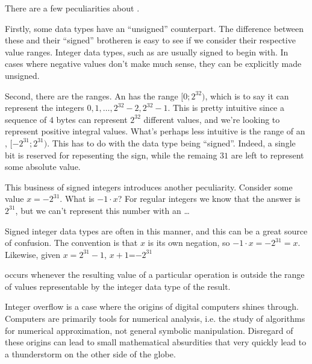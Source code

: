 There are a few peculiarities about .

Firstly, some data types have an ``unsigned'' counterpart. The difference
between these and their ``signed'' brotheren is easy to see if we consider
their respective value ranges. Integer data types, such as are usually signed
to begin with. In cases where negative values don't make much sense, they can
be explicitly made unsigned.

Second, there are the ranges. An  has the range
$[0;2^{32})$, which is to say it can represent the integers
$0,1,\ldots,2^{32}-2,2^{32}-1$. This is pretty intuitive since a sequence of
$4$ bytes can represent $2^{32}$ different values, and we're looking to
represent positive integral values. What's perhaps less intuitive is the range
of an , $[-2^{31};2^{31})$. This has to do with the data type being
``signed''. Indeed, a single bit is reserved for repesenting the sign, while
the remaing $31$ are left to represent some absolute value.

This business of signed integers introduces another peculiarity. Consider some
 value $x=-2^{31}$. What is $-1\cdot x$? For regular integers we know
that the answer is $2^{31}$, but we can't represent this number with an
\ldots

Signed integer data types are often  in this manner, and this
can be a great source of confusion. The convention is that $x$ is its own
negation, so $-1\cdot x = -2^{31} = x$. Likewise, given $x=2^{31}-1$, $x+1$=$-2^{31}$

\begin{definition}

 occurs whenever the resulting value of a particular
operation is outside the range of values representable by the integer data type
of the result.

\end{definition}

Integer overflow is a case where the origins of digital computers shines
through. Computers are primarily tools for numerical analysis, i.e.  the study
of algorithms for numerical approximation, not general symbolic manipulation.
Disregard of these origins can lead to small mathematical absurdities that very
quickly lead to a thunderstorm on the other side of the globe.

